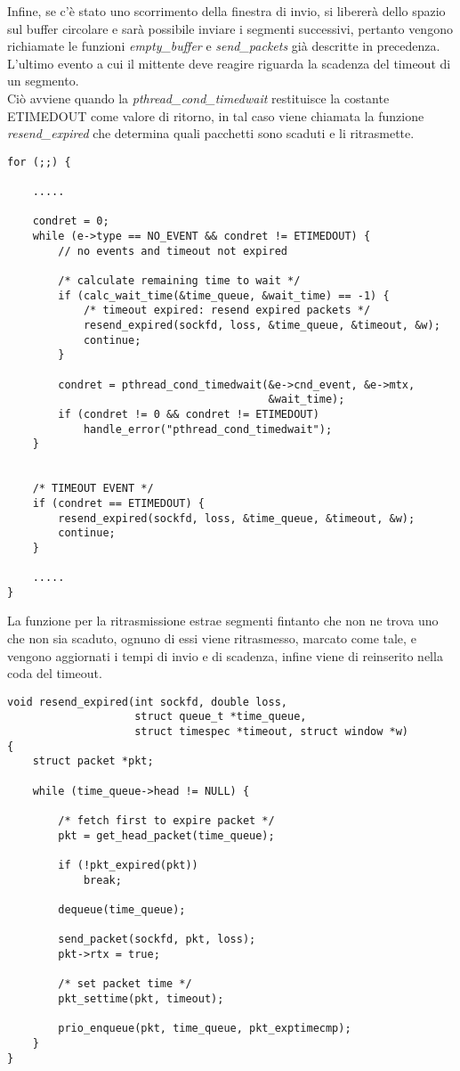 Infine, se c'è stato uno scorrimento della finestra di invio, si libererà
dello spazio sul buffer circolare e sarà possibile 
inviare i segmenti successivi, pertanto vengono richiamate le funzioni
\emph{empty\_buffer} e \emph{send\_packets} già descritte in precedenza.\\
%
L'ultimo evento a cui il mittente deve reagire riguarda la scadenza del 
timeout di un segmento.\\
Ciò avviene quando la \emph{pthread\_cond\_timedwait} restituisce la 
costante ETIMEDOUT come valore di ritorno, in tal caso viene chiamata
la funzione \emph{resend\_expired} che determina quali pacchetti sono 
scaduti e li ritrasmette.
\begin{lstlisting}[title=window.c]
for (;;) {

    .....

	condret = 0;
	while (e->type == NO_EVENT && condret != ETIMEDOUT) {
		// no events and timeout not expired

		/* calculate remaining time to wait */
		if (calc_wait_time(&time_queue, &wait_time) == -1) {
			/* timeout expired: resend expired packets */
			resend_expired(sockfd, loss, &time_queue, &timeout, &w);
			continue;
		}

		condret = pthread_cond_timedwait(&e->cnd_event, &e->mtx,
                                         &wait_time);
		if (condret != 0 && condret != ETIMEDOUT)
			handle_error("pthread_cond_timedwait");
	}


	/* TIMEOUT EVENT */
	if (condret == ETIMEDOUT) {
		resend_expired(sockfd, loss, &time_queue, &timeout, &w);
		continue;
	}

    .....
}
\end{lstlisting}
La funzione per la ritrasmissione estrae segmenti fintanto
che non ne trova uno che non sia scaduto, ognuno di essi viene ritrasmesso,
marcato come tale, e vengono aggiornati i tempi di invio e di
scadenza, infine viene di reinserito nella coda del timeout.
\begin{lstlisting}[title=transport.c]
void resend_expired(int sockfd, double loss, 
                    struct queue_t *time_queue,
                    struct timespec *timeout, struct window *w)
{
    struct packet *pkt;

    while (time_queue->head != NULL) {

        /* fetch first to expire packet */
        pkt = get_head_packet(time_queue);

        if (!pkt_expired(pkt))
            break;

        dequeue(time_queue);

        send_packet(sockfd, pkt, loss);
        pkt->rtx = true;

        /* set packet time */
        pkt_settime(pkt, timeout);

        prio_enqueue(pkt, time_queue, pkt_exptimecmp);
    }
}
\end{lstlisting}
